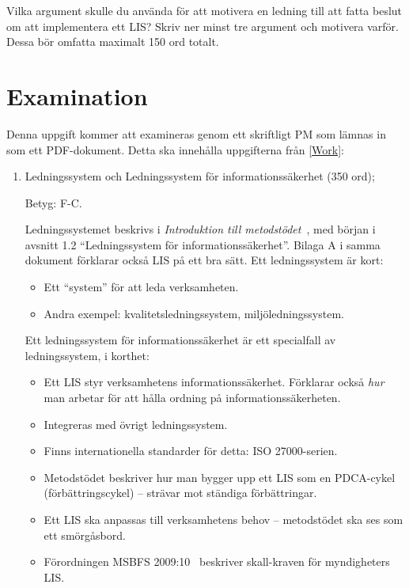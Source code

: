 \documentclass[a4paper]{llncs}
\begin{document}
Vilka argument skulle du använda för att motivera en ledning till att fatta 
beslut om att implementera ett LIS\@?
Skriv ner minst tre argument och motivera varför.
Dessa bör omfatta maximalt 150 ord totalt.


\section{Examination}
\label{sec:examination}

Denna uppgift kommer att examineras genom ett skriftligt PM som lämnas in som 
ett PDF-dokument.
Detta ska innehålla uppgifterna från \cref{Work}:
\begin{enumerate}
  \item Ledningssystem och Ledningssystem för informationssäkerhet (350 ord);
    \begin{solution}
      Betyg: F-C.

      Ledningssystemet beskrivs i \emph{Introduktion till 
        metodstödet}~\cite{MSB2011itm}, med början i avsnitt 1.2 
      \enquote{Ledningssystem för informationssäkerhet}.
      Bilaga A i samma dokument förklarar också LIS på ett bra sätt.
      Ett ledningssystem är kort:
      \begin{itemize}
        \item Ett \enquote{system} för att leda verksamheten.
        \item Andra exempel: kvalitetsledningssystem, miljöledningssystem.
      \end{itemize}

      Ett ledningssystem för informationssäkerhet är ett specialfall av 
      ledningssystem, i korthet:
      \begin{itemize}
        \item Ett LIS styr verksamhetens informationssäkerhet.
          Förklarar också \emph{hur} man arbetar för att hålla ordning på 
          informationssäkerheten.
        \item Integreras med övrigt ledningssystem.
        \item Finns internationella standarder för detta: ISO 27000-serien.
        \item Metodstödet beskriver hur man bygger upp ett LIS som en PDCA-cykel 
          (förbättringscykel) -- strävar mot ständiga förbättringar.
        \item Ett LIS ska anpassas till verksamhetens behov -- metodstödet ska 
          ses som ett smörgåsbord.
        \item Förordningen MSBFS 2009:10~\cite{MSBFS2009:10} beskriver 
          skall-kraven för myndigheters LIS\@.
      \end{itemize}
    \end{solution}


\end{enumerate}
\end{document}
